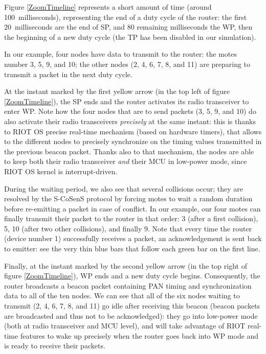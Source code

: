 \documentclass[a4paper,twoside]{article}
\begin{document}
Figure \ref{ZoomTimeline} represents a short amount of time (around
100~milliseconds), representing the end of a duty cycle of the router:
the first 20~milliseconds are the end of SP, and 80 remaining milliseconds
the WP, then the beginning of a new duty cycle (the TP has been disabled
in our simulation). 

In our example, four nodes have data to transmit to the router: the motes
number \textsf{3}, \textsf{5}, \textsf{9}, and \textsf{10}; the other nodes
(\textsf{2}, \textsf{4}, \textsf{6}, \textsf{7}, \textsf{8}, and \textsf{11})
are preparing to transmit a packet in the next duty cycle.

At the instant marked by the first yellow arrow (in the top left of figure
\ref{ZoomTimeline}), the SP ends and the router activates its radio
transceiver to enter WP. Note how the four nodes that are to send packets
(\textsf{3}, \textsf{5}, \textsf{9}, and \textsf{10}) do also activate their
radio transceivers \emph{precisely} at the same instant: this is thanks to
RIOT OS precise real-time mechanism (based on hardware timers), that allows
to the different nodes to precisely synchronize on the timing values
transmitted in the previous beacon packet. Thanks also to that mechanism,
the nodes are able to keep both their radio transceiver \emph{and} their
MCU in low-power mode, since RIOT OS kernel is interrupt-driven.

During the waiting period, we also see that several collisions occur; they
are resolved by the S-CoSenS protocol by forcing motes to wait a random
duration before re-emitting a packet in case of conflict. In our example,
our four motes can finally transmit their packet to the router in that
order: \textsf{3} (after a first collision), \textsf{5}, \textsf{10} (after
two other collisions), and finally \textsf{9}. Note that every time the
router (device number \textsf{1}) successfully receives a packet, an
acknowledgement is sent back to emitter: see the very thin blue bars that
follow each green bar on the first line.

Finally, at the instant marked by the second yellow arrow (in the top right
of figure \ref{ZoomTimeline}), WP ends and a new duty cycle begins.
Consequently, the router broadcasts a beacon packet containing PAN timing and
synchronization data to all of the ten nodes. We can see that all of the
six nodes waiting to transmit (\textsf{2}, \textsf{4}, \textsf{6}, \textsf{7},
\textsf{8}, and \textsf{11}) go idle after receiving this beacon (beacon
packets are broadcasted and thus not to be acknowledged): they go
into low-power mode (both at radio transceiver and MCU level), and will
take advantage of RIOT real-time features to wake up precisely when
the router goes back into WP mode and is ready to receive their
packets.
\end{document}
